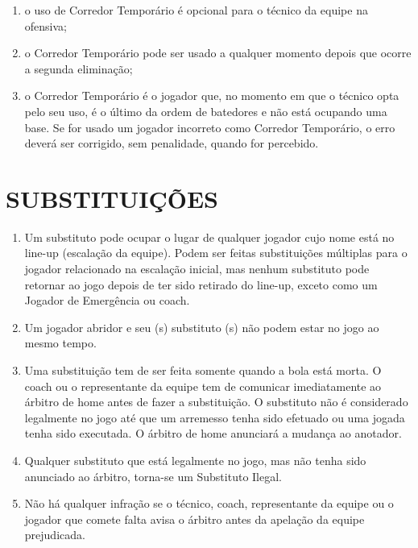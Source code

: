 \begin{multicols}{2}
	\begin{enumerate}[label=\alph*)]
		\item o uso de Corredor Tempor\'ario \'e opcional para o t\'ecnico da equipe na ofensiva; 
		
		\item  o Corredor Tempor\'ario pode ser usado a qualquer momento depois que ocorre a segunda elimina\c{c}\~ao; 
		\item o Corredor Tempor\'ario \'e o jogador que, no momento em que o t\'ecnico opta pelo seu uso, \'e o \'ultimo da ordem de batedores e n\~ao est\'a ocupando uma base. Se for usado um jogador incorreto como Corredor Tempor\'ario, o erro dever\'a ser corrigido, sem penalidade, quando for percebido. 
	\end{enumerate}
	
	\section{SUBSTITUI\c{C}\~OES} 
	
	\begin{enumerate}[label=\alph*)]
		\item Um substituto pode ocupar o lugar de qualquer jogador cujo nome est\'a no \gls{line-up} (escala\c{c}\~ao da equipe). Podem ser feitas substitui\c{c}\~oes m\'ultiplas para o jogador relacionado na escala\c{c}\~ao inicial, mas nenhum substituto pode retornar ao jogo depois de ter sido retirado do \gls{line-up}, exceto como um Jogador de Emerg\^encia ou \gls{coach}. 
		
		\item  Um jogador abridor e seu (s) substituto (s) n\~ao podem estar no jogo ao mesmo tempo. 
		
		\item  Uma substitui\c{c}\~ao tem de ser feita somente quando a bola est\'a morta. O \gls{coach} ou o representante da equipe tem de comunicar imediatamente ao \'arbitro de \gls{home} antes de fazer a substitui\c{c}\~ao. O substituto n\~ao \'e considerado legalmente no jogo at\'e que um arremesso tenha sido efetuado ou uma jogada tenha sido executada. O \'arbitro de \gls{home} anunciar\'a a mudan\c{c}a ao anotador. 
		
		\item  Qualquer substituto que est\'a legalmente no jogo, mas n\~ao tenha sido anunciado ao \'arbitro, torna-se um Substituto Ilegal. 
		
		\item  N\~ao h\'a qualquer infra\c{c}\~ao se o t\'ecnico, \gls{coach}, representante da equipe ou o jogador que comete falta avisa o \'arbitro antes da apela\c{c}\~ao da equipe prejudicada. 
		

\end{enumerate}
\end{multicols}
